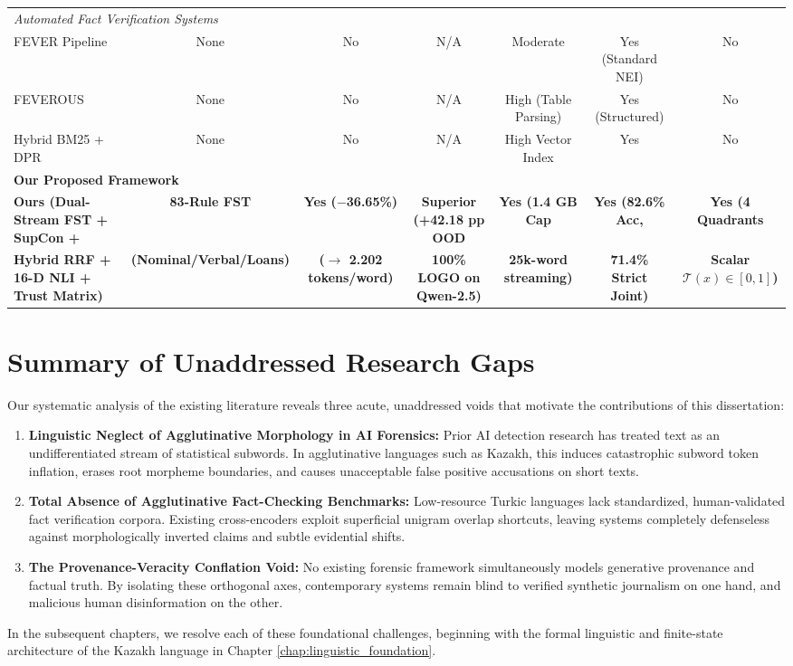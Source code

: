\begin{table}[t]
{\begin{tabular}{lcccccc}
\midrule
\multicolumn{7}{l}{\textit{Automated Fact Verification Systems}} \\
FEVER Pipeline \citep{thorne2018fever} & None & No & N/A & Moderate & Yes (Standard NEI) & No \\
FEVEROUS \citep{aly2021feverous} & None & No & N/A & High (Table Parsing) & Yes (Structured) & No \\
Hybrid BM25 + DPR \citep{karpukhin2020dpr} & None & No & N/A & High Vector Index & Yes & No \\
\midrule
\multicolumn{7}{l}{\textbf{Our Proposed Framework}} \\
\textbf{Ours (Dual-Stream FST + SupCon +} & \textbf{83-Rule FST} & \textbf{Yes ($-$36.65\%)} & \textbf{Superior (+42.18 pp OOD} & \textbf{Yes (1.4 GB Cap} & \textbf{Yes (82.6\% Acc,} & \textbf{Yes (4 Quadrants} \\
\textbf{Hybrid RRF + 16-D NLI + Trust Matrix)} & \textbf{(Nominal/Verbal/Loans)} & \textbf{($\to$ 2.202 tokens/word)} & \textbf{100\% LOGO on Qwen-2.5)} & \textbf{25k-word streaming)} & \textbf{71.4\% Strict Joint)} & \textbf{Scalar $\mathcal{T}(x) \in [0, 1]$)} \\
\bottomrule
\end{tabular}
}
\end{table}

\section{Summary of Unaddressed Research Gaps}
\label{sec:rel_gaps}

Our systematic analysis of the existing literature reveals three acute, unaddressed voids that motivate the contributions of this dissertation:
\begin{enumerate}
    \item \textbf{Linguistic Neglect of Agglutinative Morphology in AI Forensics:} Prior AI detection research has treated text as an undifferentiated stream of statistical subwords. In agglutinative languages such as Kazakh, this induces catastrophic subword token inflation, erases root morpheme boundaries, and causes unacceptable false positive accusations on short texts.
    \item \textbf{Total Absence of Agglutinative Fact-Checking Benchmarks:} Low-resource Turkic languages lack standardized, human-validated fact verification corpora. Existing cross-encoders exploit superficial unigram overlap shortcuts, leaving systems completely defenseless against morphologically inverted claims and subtle evidential shifts.
    \item \textbf{The Provenance-Veracity Conflation Void:} No existing forensic framework simultaneously models generative provenance and factual truth. By isolating these orthogonal axes, contemporary systems remain blind to verified synthetic journalism on one hand, and malicious human disinformation on the other.
\end{enumerate}

In the subsequent chapters, we resolve each of these foundational challenges, beginning with the formal linguistic and finite-state architecture of the Kazakh language in Chapter \ref{chap:linguistic_foundation}.
